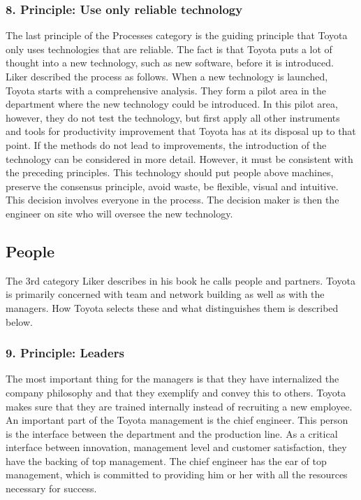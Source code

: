 \documentclass[a4paper,11pt]{article}
\begin{document}
\subsubsection*{8. Principle: Use only reliable technology}

The last principle of the Processes category is the guiding principle that
Toyota only uses technologies that are reliable. The fact is that Toyota puts
a lot of thought into a new technology, such as new software, before it is
introduced. Liker described the process as follows. When a new technology is
launched, Toyota starts with a comprehensive analysis. They form a pilot area
in the department where the new technology could be introduced. In this pilot
area, however, they do not test the technology, but first apply all other
instruments and tools for productivity improvement that Toyota has at its
disposal up to that point. If the methods do not lead to improvements, the
introduction of the technology can be considered in more detail. However, it
must be consistent with the preceding principles. This technology should put
people above machines, preserve the consensus principle, avoid waste, be
flexible, visual and intuitive. This decision involves everyone in the
process. The decision maker is then the engineer on site who will oversee the
new technology.

\subsection{People}

The 3rd category Liker describes in his book he calls people and
partners. Toyota is primarily concerned with team and network building as well
as with the managers. How Toyota selects these and what distinguishes them is
described below.

\subsubsection*{9. Principle: Leaders}

The most important thing for the managers is that they have internalized the
company philosophy and that they exemplify and convey this to others. Toyota
makes sure that they are trained internally instead of recruiting a new
employee. An important part of the Toyota management is the chief
engineer. This person is the interface between the department and the
production line. As a critical interface between innovation, management level
and customer satisfaction, they have the backing of top management. The chief
engineer has the ear of top management, which is committed to providing him or
her with all the resources necessary for success.
\end{document}
